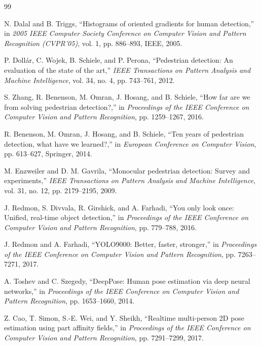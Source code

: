 \documentclass[conference]{IEEEtran}
\begin{document}
\begin{thebibliography}{99}

N. Dalal and B. Triggs, ``Histograms of oriented gradients for human detection,'' in \textit{2005 IEEE Computer Society Conference on Computer Vision and Pattern Recognition (CVPR'05)}, vol. 1, pp. 886--893, IEEE, 2005.

P. Doll\'ar, C. Wojek, B. Schiele, and P. Perona, ``Pedestrian detection: An evaluation of the state of the art,'' \textit{IEEE Transactions on Pattern Analysis and Machine Intelligence}, vol. 34, no. 4, pp. 743--761, 2012.

S. Zhang, R. Benenson, M. Omran, J. Hosang, and B. Schiele, ``How far are we from solving pedestrian detection?,'' in \textit{Proceedings of the IEEE Conference on Computer Vision and Pattern Recognition}, pp. 1259--1267, 2016.

R. Benenson, M. Omran, J. Hosang, and B. Schiele, ``Ten years of pedestrian detection, what have we learned?,'' in \textit{European Conference on Computer Vision}, pp. 613--627, Springer, 2014.

M. Enzweiler and D. M. Gavrila, ``Monocular pedestrian detection: Survey and experiments,'' \textit{IEEE Transactions on Pattern Analysis and Machine Intelligence}, vol. 31, no. 12, pp. 2179--2195, 2009.

J. Redmon, S. Divvala, R. Girshick, and A. Farhadi, ``You only look once: Unified, real-time object detection,'' in \textit{Proceedings of the IEEE Conference on Computer Vision and Pattern Recognition}, pp. 779--788, 2016.

J. Redmon and A. Farhadi, ``YOLO9000: Better, faster, stronger,'' in \textit{Proceedings of the IEEE Conference on Computer Vision and Pattern Recognition}, pp. 7263--7271, 2017.

A. Toshev and C. Szegedy, ``DeepPose: Human pose estimation via deep neural networks,'' in \textit{Proceedings of the IEEE Conference on Computer Vision and Pattern Recognition}, pp. 1653--1660, 2014.

Z. Cao, T. Simon, S.-E. Wei, and Y. Sheikh, ``Realtime multi-person 2D pose estimation using part affinity fields,'' in \textit{Proceedings of the IEEE Conference on Computer Vision and Pattern Recognition}, pp. 7291--7299, 2017.


\end{thebibliography}
\end{document}
